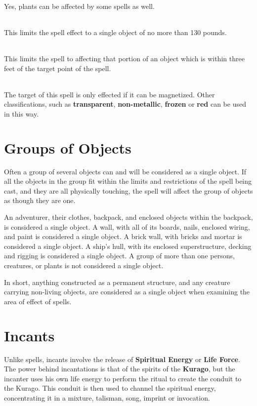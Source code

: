 \begin{multicols*}{2}
\\
Yes, plants can be affected by some spells as well.

\\
This limits the spell effect to a single object of no more than 130 pounds.

\\
This limits the spell to affecting that portion of an object which is within three feet of the target point of the spell.

\\
The target of this spell is only effected if it can be magnetized. Other classifications, such as \textbf{transparent}, \textbf{non-metallic}, \textbf{frozen} or \textbf{red} can be used in this way.
\section{Groups of Objects}
Often a group of several objects can and will be considered as a single object. If all the objects in the group fit within the limits and restrictions of the spell being cast, and they are all physically touching, the spell will affect the group
of objects as though they are one. 

An adventurer, their clothes, backpack, and enclosed objects within the backpack, is considered a single object. A wall, with all of its boards, nails, enclosed wiring, and paint is considered a single object. A brick wall, with bricks and mortar is considered a single object. A ship’s hull, with its enclosed superstructure, decking and rigging is considered a single object. A group of more than one persons, creatures, or plants is not considered a single object.

In short, anything constructed as a permanent structure, and any creature carrying non-living objects, are considered as a single object when examining the area of effect of spells.
\section{Incants}
Unlike spells, incants involve the release of \textbf{Spiritual Energy} or \textbf{Life Force}. The power behind incantations is that of the spirits of the \textbf{Kurago}, but the incanter uses his own life energy to perform the ritual to create the conduit to the Kurago. This conduit is then used to channel the spiritual energy, concentrating it in a mixture, talisman, song, imprint or invocation. 


\end{multicols*}
